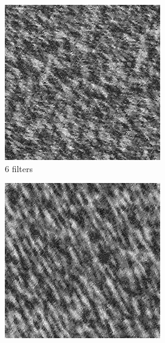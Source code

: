 \documentclass[11pt, oneside]{article}   	%
\begin{document}
\begin{figure}[H]
    \begin{subfigure}[b]{0.3\textwidth}
        \includegraphics[width=\textwidth]{fur6}
        \caption{6 filters}
        \label{fig:fur6}
    \end{subfigure}
    \begin{subfigure}[b]{0.3\textwidth}
        \includegraphics[width=\textwidth]{fur12}

\end{subfigure}
\end{figure}
\end{document}
